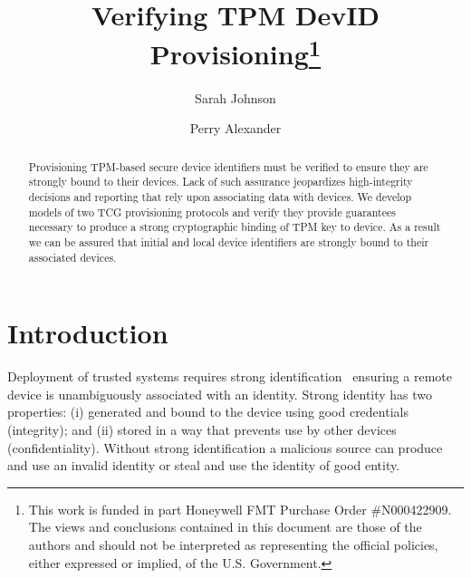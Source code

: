 \documentclass[runningheads]{llncs}
\begin{document}
%
\title{Verifying TPM DevID Provisioning\thanks{This work is funded in part
    Honeywell FMT Purchase Order
    \#N000422909. The views and conclusions contained in this document
    are those of the authors and should not be interpreted as
    representing the official policies, either expressed or implied,
    of the U.S. Government.}}
%
%
\author{Sarah Johnson \and
Perry Alexander}
%
%
%
\maketitle              %
%
\begin{abstract}
  Provisioning TPM-based secure device identifiers must be verified to
  ensure they are strongly bound to their devices.  Lack of such
  assurance jeopardizes high-integrity decisions and reporting that
  rely upon associating data with devices.  We develop models of two
  TCG provisioning protocols and verify they provide guarantees
  necessary to produce a strong cryptographic binding of TPM key to
  device.  As a result we can be assured that initial and local device
  identifiers are strongly bound to their associated devices.

\end{abstract}
%
%
%
\section{Introduction}

Deployment of trusted systems requires strong
identification~\citep{Martin:08:The-ten-page-in} ensuring a remote
device is unambiguously associated with an identity. Strong identity
has two properties: (i) generated and bound to the device using good
credentials (integrity); and (ii) stored in a way that prevents use by
other devices (confidentiality).  Without strong identification a
malicious source can produce and use an invalid identity or steal and
use the identity of good entity.
\end{document}
